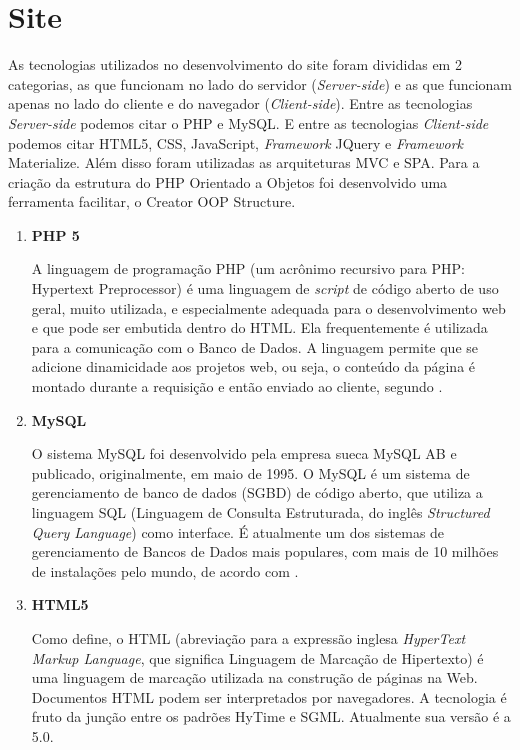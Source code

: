 \section{Site}\label{Sub:tecnologias-site}
As tecnologias utilizados no desenvolvimento do site foram divididas em 2 categorias, as que funcionam no lado do servidor (\textit{Server-side}) e as que funcionam apenas no lado do cliente e do navegador (\textit{Client-side}). Entre as tecnologias \textit{Server-side} podemos citar o PHP e MySQL. E entre as tecnologias \textit{Client-side} podemos citar HTML5, CSS, JavaScript, \textit{Framework }JQuery e \textit{Framework} Materialize. Além disso foram utilizadas as arquiteturas MVC e SPA. Para a criação da estrutura do PHP Orientado a Objetos foi desenvolvido uma ferramenta facilitar, o Creator OOP Structure.

\begin{enumerate}
\item \textbf{PHP 5}

A linguagem de programação PHP (um acrônimo recursivo para PHP: Hypertext Preprocessor) é uma linguagem de \textit{script} de código aberto de uso geral, muito utilizada, e especialmente adequada para o desenvolvimento web e que pode ser embutida dentro do HTML. Ela frequentemente é utilizada para a comunicação com o Banco de Dados. A linguagem permite que se adicione dinamicidade aos projetos web, ou seja, o conteúdo da página é montado durante a requisição e então enviado ao cliente, segundo .

\item \textbf{MySQL}

O sistema MySQL foi desenvolvido pela empresa sueca MySQL AB e publicado, originalmente, em maio de 1995. O MySQL é um sistema de gerenciamento de banco de dados (SGBD) de código aberto, que utiliza a linguagem SQL (Linguagem de Consulta Estruturada, do inglês \textit{Structured Query Language}) como interface. É atualmente um dos sistemas de gerenciamento de Bancos de Dados mais populares, com mais de 10 milhões de instalações pelo mundo, de acordo com \cite{miletto2014desenvolvimento}.

\item \textbf{HTML5}

Como  define, o HTML (abreviação para a expressão inglesa \textit{HyperText Markup Language}, que significa Linguagem de Marcação de Hipertexto) é uma linguagem de marcação utilizada na construção de páginas na Web. Documentos HTML podem ser interpretados por navegadores. A tecnologia é fruto da junção entre os padrões HyTime e SGML. Atualmente sua versão é a 5.0.


\end{enumerate}
